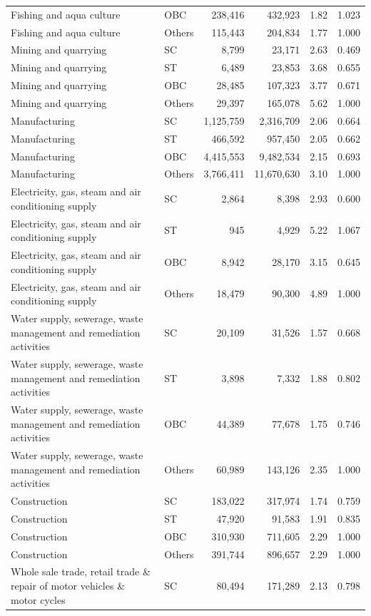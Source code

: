 \documentclass[11pt,a4paper]{report}
\begin{document}
\begin{longtable}{>{\raggedright\arraybackslash}p{5cm}lrrrr}
Fishing and aqua culture & OBC & 238,416 & 432,923 & 1.82 & 1.023 \\
Fishing and aqua culture & Others & 115,443 & 204,834 & 1.77 & 1.000 \\
Mining and quarrying & SC & 8,799 & 23,171 & 2.63 & 0.469 \\
Mining and quarrying & ST & 6,489 & 23,853 & 3.68 & 0.655 \\
Mining and quarrying & OBC & 28,485 & 107,323 & 3.77 & 0.671 \\
Mining and quarrying & Others & 29,397 & 165,078 & 5.62 & 1.000 \\
Manufacturing & SC & 1,125,759 & 2,316,709 & 2.06 & 0.664 \\
Manufacturing & ST & 466,592 & 957,450 & 2.05 & 0.662 \\
Manufacturing & OBC & 4,415,553 & 9,482,534 & 2.15 & 0.693 \\
Manufacturing & Others & 3,766,411 & 11,670,630 & 3.10 & 1.000 \\
Electricity, gas, steam and air conditioning supply & SC & 2,864 & 8,398 & 2.93 & 0.600 \\
Electricity, gas, steam and air conditioning supply & ST & 945 & 4,929 & 5.22 & 1.067 \\
Electricity, gas, steam and air conditioning supply & OBC & 8,942 & 28,170 & 3.15 & 0.645 \\
Electricity, gas, steam and air conditioning supply & Others & 18,479 & 90,300 & 4.89 & 1.000 \\
Water supply, sewerage, waste management and remediation activities & SC & 20,109 & 31,526 & 1.57 & 0.668 \\
Water supply, sewerage, waste management and remediation activities & ST & 3,898 & 7,332 & 1.88 & 0.802 \\
Water supply, sewerage, waste management and remediation activities & OBC & 44,389 & 77,678 & 1.75 & 0.746 \\
Water supply, sewerage, waste management and remediation activities & Others & 60,989 & 143,126 & 2.35 & 1.000 \\
Construction & SC & 183,022 & 317,974 & 1.74 & 0.759 \\
Construction & ST & 47,920 & 91,583 & 1.91 & 0.835 \\
Construction & OBC & 310,930 & 711,605 & 2.29 & 1.000 \\
Construction & Others & 391,744 & 896,657 & 2.29 & 1.000 \\
Whole sale trade, retail trade \& repair of motor vehicles \& motor cycles & SC & 80,494 & 171,289 & 2.13 & 0.798 \\

\end{longtable}
\end{document}
